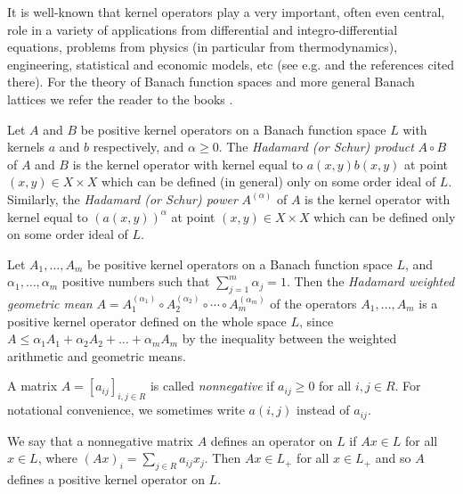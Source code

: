 \documentclass[12pt, reqno]{amsart}
\theoremstyle{definition}
\theoremstyle{remark}
\numberwithin{equation}{section}
\begin{document}
It is well-known that kernel operators play a very important, often even central, role in a variety of applications from differential and integro-differential equations, problems from physics
(in particular from thermodynamics), engineering, statistical and economic models, etc (see e.g. \cite{J82, P19} %
and the references cited there).
For the theory of Banach function spaces and more general Banach lattices we refer the reader to the books \cite{Za83, BS88, AA02, AB85, Me91}.

Let $A$ and $B$ be positive kernel operators on a Banach function space $L$ with kernels $a$ and $b$ respectively,
and $\alpha \ge 0$.
The \textit{Hadamard (or Schur) product} $A \circ B$ of $A$ and $B$ is the kernel operator
with kernel equal to $a(x,y)b(x,y)$ at point $(x,y) \in X \times X$ which can be defined (in general)
only on some order ideal of $L$. Similarly, the \textit{Hadamard (or Schur) power}
$A^{(\alpha)}$ of $A$ is the kernel operator with kernel equal to $(a(x, y))^{\alpha}$
at point $(x,y) \in X \times X$ which can be defined only on some order ideal of $L$.

Let $A_1 ,\ldots, A_m$ be positive kernel operators on a Banach function space $L$,
and $\alpha _1, \ldots, \alpha _m$ positive numbers such that $\sum_{j=1}^m \alpha _j = 1$.
Then the {\it  Hadamard weighted geometric mean}
$A = A_1 ^{( \alpha _1)} \circ A_2 ^{(\alpha _2)} \circ \cdots \circ A_m ^{(\alpha _m)}$ of
the operators $A_1 ,\ldots, A_m$ is a positive kernel operator defined
on the whole space $L$, since $A \le \alpha _1 A_1 + \alpha _2 A_2 + \ldots + \alpha _m A_m$ by the inequality between the weighted arithmetic and geometric means.

A matrix $A=[a_{ij}]_{i,j\in R}$ is called {\it nonnegative} if $a_{ij}\ge 0$ for all $i, j \in R$.
For notational convenience, we sometimes write $a(i,j)$ instead of $a_{ij}$.

We say that a nonnegative matrix $A$ defines an operator on $L$ if $Ax \in L$ for all $x\in L$, where
$(Ax)_i = \sum _{j \in R}a_{ij}x_j$. Then $Ax \in L_+$ for all $x\in L_+$ and
so $A$ defines a positive kernel operator on $L$.
\end{document}
